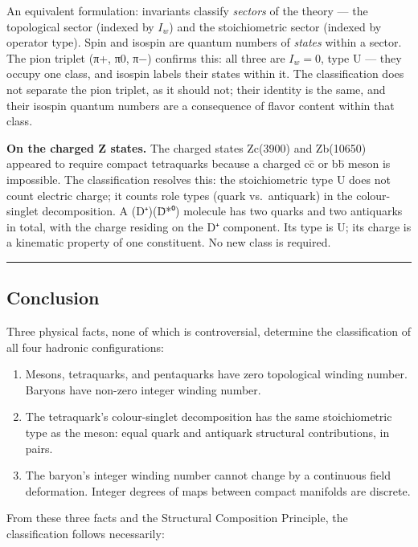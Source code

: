 \documentclass[12pt,a4paper]{article}
\begin{document}
An equivalent formulation: invariants classify \emph{sectors}
of the theory --- the topological sector (indexed by \(I_w\)) and the
stoichiometric sector (indexed by operator type). Spin and isospin are
quantum numbers of \emph{states} within a sector. The pion triplet (π+,
π0, π−) confirms this: all three are \(I_w = 0\), type U --- they occupy
one class, and isospin labels their states within it. The
classification does not separate the pion triplet, as it should not;
their identity is the same, and their isospin quantum numbers
are a consequence of flavor content within that class.

\textbf{On the charged Z states.} The charged states Zc(3900) and
Zb(10650) appeared to require compact tetraquarks because a charged cc̄
or bb̄ meson is impossible. The classification resolves this: the
stoichiometric type U does not count electric charge; it counts
role types (quark vs.~antiquark) in the colour-singlet
decomposition. A (D⁺)(D̄*⁰) molecule has two quarks and two antiquarks in
total, with the charge residing on the D⁺ component. Its type
is U; its charge is a kinematic property of one constituent. No new
class is required.

\begin{center}\rule{0.5\linewidth}{0.5pt}\end{center}

\hypertarget{conclusion}{%
\subsection{Conclusion}\label{conclusion}}

Three physical facts, none of which is controversial, determine the
classification of all four hadronic configurations:

\begin{enumerate}
\def\labelenumi{\arabic{enumi}.}
\item
  Mesons, tetraquarks, and pentaquarks have zero topological winding
  number. Baryons have non-zero integer winding number.
\item
  The tetraquark's colour-singlet decomposition has the same
  stoichiometric type as the meson: equal quark and antiquark structural
  contributions, in pairs.
\item
  The baryon's integer winding number cannot change by a continuous
  field deformation. Integer degrees of maps between compact manifolds
  are discrete.
\end{enumerate}

From these three facts and the Structural Composition Principle, the
classification follows necessarily:
\end{document}
